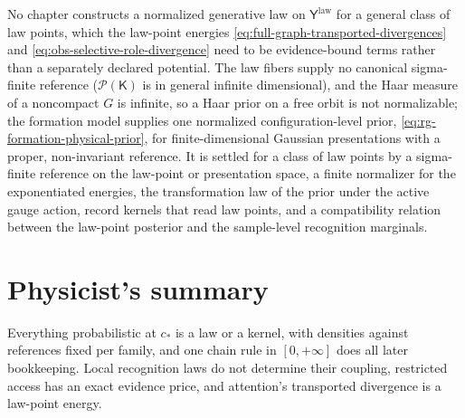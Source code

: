 No chapter constructs a normalized generative law on $\mathsf Y^{\mathrm{law}}$ for a general class of law
points, which the law-point energies \eqref{eq:full-graph-transported-divergences} and
\eqref{eq:obs-selective-role-divergence} need to be evidence-bound terms rather than a separately declared
potential. The law fibers supply no canonical sigma-finite reference ($\mathcal P(\mathsf K)$ is in general
infinite dimensional), and the Haar measure of a noncompact $G$ is infinite, so a Haar prior on a free orbit
is not normalizable; the formation model supplies one normalized configuration-level prior,
\eqref{eq:rg-formation-physical-prior}, for finite-dimensional Gaussian presentations with a proper,
non-invariant reference. It is settled for a class of law points by a sigma-finite reference on the law-point
or presentation space, a finite normalizer for the exponentiated energies, the transformation law of the prior
under the active gauge action, record kernels that read law points, and a compatibility relation between the
law-point posterior and the sample-level recognition marginals.

\section*{Physicist's summary}

Everything probabilistic at $c_*$ is a law or a kernel, with densities against references fixed per family,
and one chain rule in $[0,+\infty]$ does all later bookkeeping. Local recognition laws do not determine their
coupling, restricted access has an exact evidence price, and attention's transported divergence is a
law-point energy.
